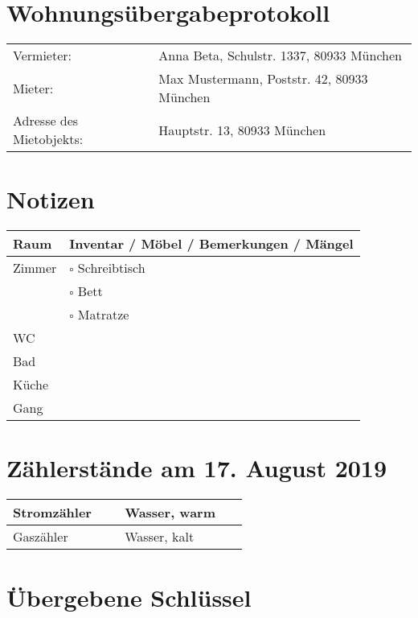 \documentclass[a4paper]{scrartcl}
\begin{document}
\section*{Wohnungsübergabeprotokoll}

\begin{tabular*}{\textwidth}{ll@{}}
Vermieter:               & Anna Beta, Schulstr. 1337, 80933 München \\
Mieter:                  & Max Mustermann, Poststr. 42, 80933 München \\
Adresse des Mietobjekts: & Hauptstr. 13, 80933 München \\
\end{tabular*}

\section*{Notizen}
\begin{tabular*}{\textwidth}{|L{2.5cm}|L{14.2cm}@{}|}
\hline
\textbf{Raum}   & \textbf{Inventar / Möbel / Bemerkungen / Mängel} \\ \hline
Zimmer & $\square$ Schreibtisch \\
~      & $\square$ Bett         \\
~      & $\square$ Matratze     \\[55pt] \hline
WC     &                        \\[55pt] \hline
Bad    &                        \\[55pt] \hline
Küche  &                        \\[55pt] \hline
Gang   &                        \\[25pt] \hline
\end{tabular*}


\section*{Zählerstände am 17. August 2019}

\begin{tabular*}{\textwidth}{|l|L{4cm}|l|L{7.2cm}|}
\hline
Stromzähler & ~ & Wasser, warm & ~ \\[10pt] \hline
Gaszähler   & ~ & Wasser, kalt & ~ \\[10pt] \hline
\end{tabular*}


\section*{Übergebene Schlüssel}
\end{document}

